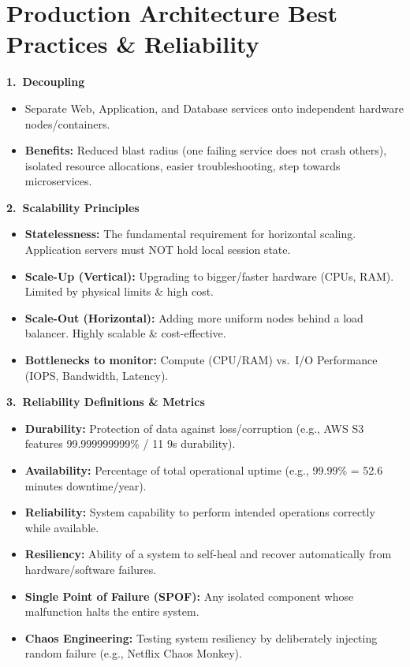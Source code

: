 ﻿\documentclass[8pt, a4paper]{article}
\begin{document}
\section{Production Architecture Best Practices \& Reliability}

\begin{conceptbox}
\textbf{1.\ Decoupling}
\begin{itemize}
  \item Separate Web, Application, and Database services onto independent hardware nodes/containers.
  \item \textbf{Benefits:} Reduced blast radius (one failing service does not crash others), isolated resource allocations, easier troubleshooting, step towards microservices.
\end{itemize}
\end{conceptbox}

\begin{conceptbox}
\textbf{2.\ Scalability Principles}
\begin{itemize}
  \item \textbf{Statelessness:} The fundamental requirement for horizontal scaling. Application servers must NOT hold local session state.
  \item \textbf{Scale-Up (Vertical):} Upgrading to bigger/faster hardware (CPUs, RAM). Limited by physical limits \& high cost.
  \item \textbf{Scale-Out (Horizontal):} Adding more uniform nodes behind a load balancer. Highly scalable \& cost-effective.
  \item \textbf{Bottlenecks to monitor:} Compute (CPU/RAM) vs.\ I/O Performance (IOPS, Bandwidth, Latency).
\end{itemize}
\end{conceptbox}

\begin{conceptbox}
\textbf{3.\ Reliability Definitions \& Metrics}
\begin{itemize}
  \item \textbf{Durability:} Protection of data against loss/corruption (e.g., AWS S3 features 99.999999999\% / 11 9s durability).
  \item \textbf{Availability:} Percentage of total operational uptime (e.g., 99.99\% = 52.6 minutes downtime/year).
  \item \textbf{Reliability:} System capability to perform intended operations correctly while available.
  \item \textbf{Resiliency:} Ability of a system to self-heal and recover automatically from hardware/software failures.
  \item \textbf{Single Point of Failure (SPOF):} Any isolated component whose malfunction halts the entire system.
  \item \textbf{Chaos Engineering:} Testing system resiliency by deliberately injecting random failure (e.g., Netflix Chaos Monkey).
\end{itemize}
\end{conceptbox}
\end{document}
